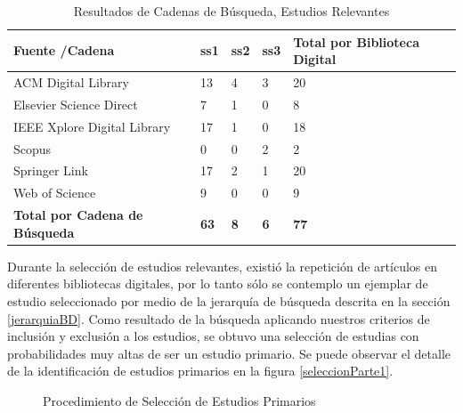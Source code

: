 \documentclass{report}
\begin{document}
            \begin{table}
                \begin{center}
                \caption{Resultados de Cadenas de Búsqueda, Estudios Relevantes}
                \label{table:ResultsSearchStringOutStandingStudies}
                    \begin{tabular}{| p{6cm} | p{1cm} | p{1cm} | p{1cm} | p{4cm} |}
                        \toprule
                        \hline
                        \textbf{Fuente /Cadena} & \textbf{ss1} & \textbf{ss2} & \textbf{ss3} & \textbf{Total por Biblioteca Digital}\\ \hline
                        ACM Digital Library & 13 & 4 & 3 & 20 \\ \hline
                        Elsevier Science Direct & 7 & 1 & 0 & 8\\ \hline
                        IEEE Xplore Digital Library & 17 & 1 & 0 & 18\\ \hline
                        Scopus & 0 & 0 & 2 & 2\\ \hline
                        Springer Link & 17 & 2 & 1 &  20\\ \hline
                        Web of Science & 9 & 0 & 0 & 9 \\ \hline
                        \textbf{Total por Cadena de Búsqueda} & \textbf{63} & \textbf{8} & \textbf{6} & \textbf{77}\\ \hline
                    \end{tabular}
                \end{center}
            \end{table}
            Durante la selección de estudios relevantes, existió la repetición de artículos en diferentes bibliotecas digitales, por lo tanto sólo se contemplo un ejemplar de estudio seleccionado por medio de la jerarquía de búsqueda descrita en la sección \ref{jerarquiaBD}. Como resultado de la búsqueda aplicando nuestros criterios de inclusión y exclusión a los estudios, se obtuvo una selección de estudias con probabilidades muy altas de ser un estudio primario. Se puede observar el detalle de la identificación de estudios primarios en la figura \ref{seleccionParte1}.\\            
            \begin{figure}
                \centering
        		\caption{Procedimiento de Selección de Estudios Primarios}
         	\end{figure}
            
\end{document}
